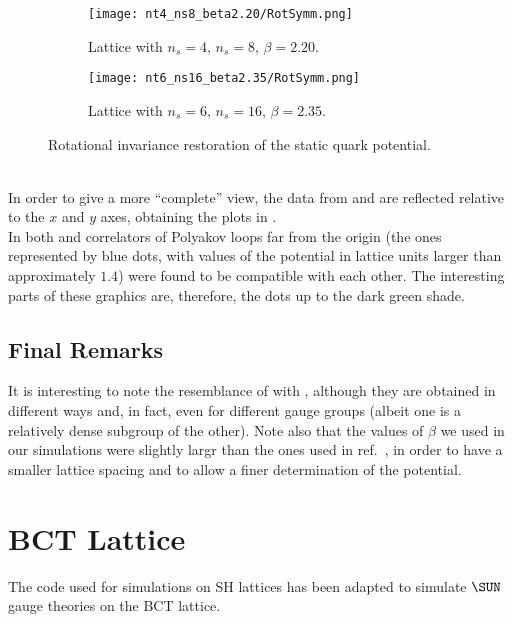 \begin{figure}[!htbp]
    \centering
    \begin{subfigure}[b]{0.48\textwidth}
        \texttt{[image: nt4\_ns8\_beta2.20/RotSymm.png]}
        \caption{Lattice with $n_s=4$, $n_s=8$, $\beta=2.20$.}
        \label{4F:PotentialRestorationLargea}
    \end{subfigure}
    \begin{subfigure}[b]{0.48\textwidth}
        \texttt{[image: nt6\_ns16\_beta2.35/RotSymm.png]}
        \caption{Lattice with $n_s=6$, $n_s=16$, $\beta=2.35$.}
        \label{4F:PotentialRestorationSmalla}
    \end{subfigure}
    \caption{Rotational invariance restoration of the static quark potential.}
    \label{4F:PotentialRestoration}
\end{figure}\\
In order to give a more ``complete'' view, the data from  and  are reflected relative to the $x$ and $y$ axes, obtaining the plots in .\\
In both  and  correlators of Polyakov loops far from the origin (the ones represented by blue dots, with values of the potential in lattice units larger than approximately $1.4$) were found to be compatible with each other.
The interesting parts of these graphics are, therefore, the dots up to the dark green shade.

\subsection{Final Remarks}
It is interesting to note the resemblance of  with , although they are obtained in different ways and, in fact, even for different gauge groups (albeit one is a relatively dense subgroup of the other).
Note also that the values of $\beta$ we used in our simulations were slightly largr than the ones used in ref.~\cite{Lang:1982tj}, in order to have a smaller lattice spacing and to allow a finer determination of the potential.

\section{BCT Lattice}
The code used for simulations on SH lattices has been adapted to simulate $\SUN$ gauge theories on the BCT lattice.

